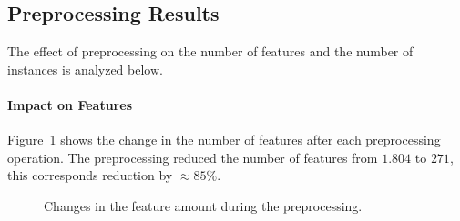 \subsection{Preprocessing Results}
The effect of preprocessing on the number of features and the number of instances is analyzed below.

\paragraph*{Impact on Features} \hfill \break
Figure~\ref{fig:features-preprocessing} shows the change in the number of features after each preprocessing operation. The preprocessing reduced the number of features from \(1.804\) to \(271\), this corresponds reduction by \(\approx85\%\). 

\begin{figure}[h!]
    \centering
    \caption{Changes in the feature amount during the preprocessing.}
    \label{fig:features-preprocessing}
\end{figure}

